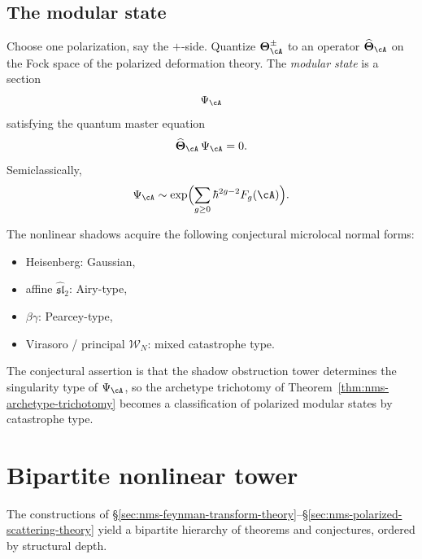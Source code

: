 \subsection{The modular state}
\label{subsec:nms-modular-state}

\begin{definition}
\label{def:nms-modular-state}
%
Choose one polarization, say the $+$-side. Quantize
$\boldsymbol\Theta_{\cA}^{\pm}$ to an operator
$\widehat{\boldsymbol\Theta}_{\cA}$ on the Fock space of the polarized
deformation theory. The \emph{modular state} is a section
\[
\Psi_{\cA}
\]
satisfying the quantum master equation
\[
\widehat{\boldsymbol\Theta}_{\cA}\,\Psi_{\cA}=0.
\]
Semiclassically,
\[
\Psi_{\cA} \sim \exp\Bigl(\sum_{g\ge 0} \hbar^{2g-2}F_g(\cA)\Bigr).
\]
\end{definition}

\begin{remark}
\label{rem:nms-state-normal-forms}
The nonlinear shadows acquire the following conjectural microlocal
normal forms:
\begin{itemize}
\item Heisenberg: Gaussian,
\item affine $\widehat{\mathfrak{sl}}_2$: Airy-type,
\item $\beta\gamma$: Pearcey-type,
\item Virasoro / principal $\mathcal W_N$: mixed catastrophe type.
\end{itemize}
The conjectural assertion is that the shadow obstruction tower
determines the singularity type of $\Psi_{\cA}$, so the archetype
trichotomy of Theorem~\ref{thm:nms-archetype-trichotomy} becomes a
classification of polarized modular states by catastrophe type.
\end{remark}

\section{Bipartite nonlinear tower}
\label{sec:nms-theorem-hierarchy}

The constructions of \S\ref{sec:nms-feynman-transform-theory}--\S\ref{sec:nms-polarized-scattering-theory} yield a bipartite hierarchy of theorems and conjectures, ordered by structural depth.

